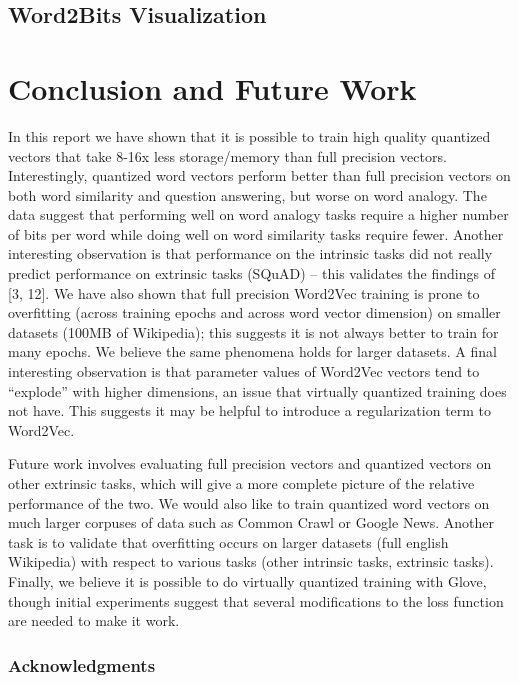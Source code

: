 \documentclass{article} %
\begin{document}
\subsection{Word2Bits Visualization}


\section{Conclusion and Future Work}

In this report we have shown that it is possible to train high quality
quantized vectors that take 8-16x less storage/memory than full
precision vectors. Interestingly, quantized word vectors perform
better than full precision vectors on both word similarity and
question answering, but worse on word analogy. The data suggest that
performing well on word analogy tasks require a higher number of bits
per word while doing well on word similarity tasks require
fewer. Another interesting observation is that performance on the
intrinsic tasks did not really predict performance on extrinsic tasks
(SQuAD) -- this validates the findings of [3, 12]. We  have also shown
that full precision Word2Vec training is prone to overfitting (across
training epochs and across word vector dimension) on smaller datasets
(100MB of Wikipedia); this suggests it is not always better to train
for many epochs. We believe the same phenomena holds for larger
datasets. A final interesting observation is that parameter values of
Word2Vec vectors tend to ``explode'' with higher dimensions, an issue
that virtually quantized training does not have. This suggests it may
be helpful to introduce a regularization term to Word2Vec.

Future work involves evaluating full precision vectors and quantized
vectors on other extrinsic tasks, which will give a more complete
picture of the relative performance of the two. We would also like to
train quantized word vectors on much larger corpuses of data such as
Common Crawl or Google News. Another task is to validate that
overfitting occurs on larger datasets (full english Wikipedia) with
respect to various tasks (other intrinsic tasks, extrinsic
tasks). Finally, we believe it is possible to do virtually quantized
training with Glove, though initial experiments suggest that
several modifications to the loss function are needed to make it work.

\subsubsection*{Acknowledgments}
\end{document}
